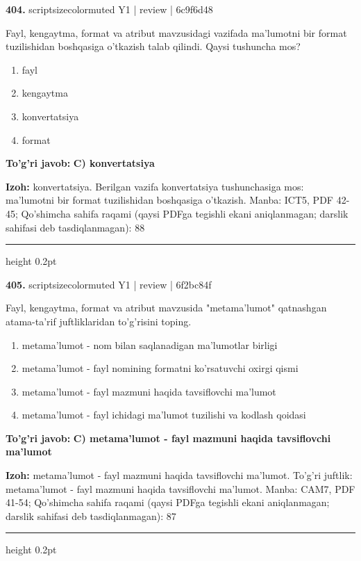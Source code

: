 \documentclass[10pt,a4paper]{article}
\begin{document}
{\bfseries\sffamily\color{ink} 404.} {scriptsizecolor{muted} Y1 | review | 6c9f6d48}
\par
Fayl, kengaytma, format va atribut mavzusidagi vazifada ma'lumotni bir format tuzilishidan boshqasiga o'tkazish talab qilindi. Qaysi tushuncha mos?
\begin{enumerate}[label=\Alph*),leftmargin=9mm]
\item fayl
\item kengaytma
\item konvertatsiya
\item format
\end{enumerate}
\begin{tcolorbox}[enhanced,breakable,colback=teal!4,colframe=teal!60!black,boxrule=0.45pt,arc=1.2mm,left=2.7mm,right=2.7mm,top=1.8mm,bottom=1.8mm,before skip=2mm,after skip=2mm]
{\bfseries\sffamily\color{teal}To'g'ri javob:} \textbf{C) konvertatsiya}
\par\smallskip
{\bfseries Izoh:} konvertatsiya. Berilgan vazifa konvertatsiya tushunchasiga mos: ma'lumotni bir format tuzilishidan boshqasiga o'tkazish. Manba: ICT5, PDF 42-45; Qo'shimcha sahifa raqami (qaysi PDFga tegishli ekani aniqlanmagan; darslik sahifasi deb tasdiqlanmagan): 88
\end{tcolorbox}
\vspace{2mm}\hrule height 0.2pt\vspace{3mm}

{\bfseries\sffamily\color{ink} 405.} {scriptsizecolor{muted} Y1 | review | 6f2bc84f}
\par
Fayl, kengaytma, format va atribut mavzusida "metama'lumot" qatnashgan atama-ta'rif juftliklaridan to'g'risini toping.
\begin{enumerate}[label=\Alph*),leftmargin=9mm]
\item metama'lumot - nom bilan saqlanadigan ma'lumotlar birligi
\item metama'lumot - fayl nomining formatni ko'rsatuvchi oxirgi qismi
\item metama'lumot - fayl mazmuni haqida tavsiflovchi ma'lumot
\item metama'lumot - fayl ichidagi ma'lumot tuzilishi va kodlash qoidasi
\end{enumerate}
\begin{tcolorbox}[enhanced,breakable,colback=teal!4,colframe=teal!60!black,boxrule=0.45pt,arc=1.2mm,left=2.7mm,right=2.7mm,top=1.8mm,bottom=1.8mm,before skip=2mm,after skip=2mm]
{\bfseries\sffamily\color{teal}To'g'ri javob:} \textbf{C) metama'lumot - fayl mazmuni haqida tavsiflovchi ma'lumot}
\par\smallskip
{\bfseries Izoh:} metama'lumot - fayl mazmuni haqida tavsiflovchi ma'lumot. To'g'ri juftlik: metama'lumot - fayl mazmuni haqida tavsiflovchi ma'lumot. Manba: CAM7, PDF 41-54; Qo'shimcha sahifa raqami (qaysi PDFga tegishli ekani aniqlanmagan; darslik sahifasi deb tasdiqlanmagan): 87
\end{tcolorbox}
\vspace{2mm}\hrule height 0.2pt\vspace{3mm}
\end{document}
